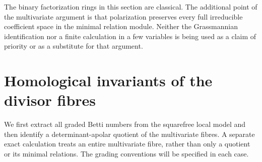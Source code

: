 \documentclass[11pt,reqno]{amsart}
\numberwithin{equation}{section}
\theoremstyle{definition}\newtheorem{definition}[theorem]{Definition}
\theoremstyle{remark}\newtheorem{remark}[theorem]{Remark}
\begin{document}
The binary factorization rings in this section are classical. The
additional point of the multivariate argument is that polarization
preserves every full irreducible coefficient space in the minimal
relation module. Neither the Grassmannian identification nor a finite
calculation in a few variables is being used as a claim of priority
or as a substitute for that argument.

\section{Homological invariants of the divisor fibres}
\label{sec:homological-v154}
We first extract all graded Betti numbers from the squarefree local
model and then identify a determinant-apolar quotient of the
multivariate fibres. A separate exact calculation treats an entire
multivariate fibre, rather than only a quotient or its minimal
relations. The grading conventions will be specified in each case.
\end{document}
